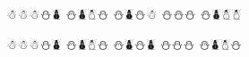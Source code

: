 \documentclass{article}
\begin{document}
\begin{whitesnowman}
☃☃☃⛄⛇ %
⛄⛇☃⛄
⛄⛇⛄☃ %
⛄⛄⛄ %
⛄⛇☃☃ %
\end{whitesnowman}

\begin{whitesnowman}
☃☃☃⛄⛇ %
⛄⛇☃⛄
⛄⛇⛄⛇ %
⛄⛄⛄ %
⛄⛇☃⛄ %
\end{whitesnowman}
\end{document}

